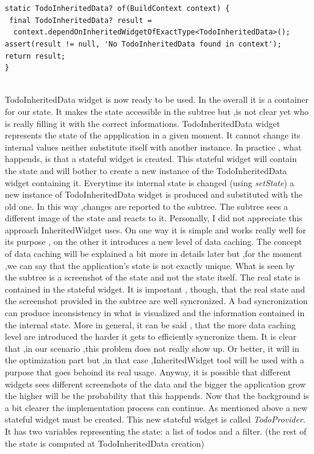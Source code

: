 \mbox{}\\
\begin{code}
 \mbox{}
\label{code:2.17}
\begin{verbatim}

static TodoInheritedData? of(BuildContext context) {
 final TodoInheritedData? result =
  context.dependOnInheritedWidgetOfExactType<TodoInheritedData>(); 
assert(result != null, 'No TodoInheritedData found in context');
return result;
}
\end{verbatim}
\end{code}
\mbox{}\\

TodoInheritedData widget is now ready to be used. In the overall it is a container for our state. It makes the state accessible in the subtree but ,is not clear yet who is really filling it with the correct informations. TodoInheritedData widget represents the state of the appplication in a given moment. It cannot change its internal values neither substitute itself with another instance. In practice , what happends, is that a stateful widget is created. This stateful widget will contain the state and will bother to create a new instance of the TodoInheritedData widget containing it. Everytime its internal state is changed (using \textit{setState}) a new instance of TodoInheritedData widget is produced and substituted with the old one. In this way ,changes are reported to the subtree. The subtree sees a different image of the state and reacts to it. Personally, I did not appreciate this approach InheritedWidget uses. On one way it is simple and works really well for its purpose , on the other it introduces a new level of data caching. The concept of data caching will be explained a bit more in details later but ,for the moment ,we can say that the application's state is not exactly unique. What is seen by the subtree is a screenshot of the state and not the state itself. The real state is contained in the stateful widget. It is important , though, that the real state and the screenshot provided in the subtree are well syncronized. A bad syncronization can produce inconsistency in what is visualized and the information contained in the internal state. More in general, it can be said , that the more data caching level are introduced the harder it gets to efficiently syncronize them. It is clear that ,in our scenario ,this problem does not really show up. Or better, it will in the optimization part but ,in that case ,InheritedWidget tool will be used with a purpose that goes behoind its real usage. Anyway, it is possible that different widgets sees different screenshots of the data and the bigger the application grow the higher will be the probability that this happends. Now that the background is a bit clearer the implementation process can continue. As mentioned above a new stateful widget must be created. This new stateful widget is called \textit{TodoProvider.} It has two variables representing the state: a list of todos and a filter. (the rest of the state is computed at TodoInheritedData creation)
